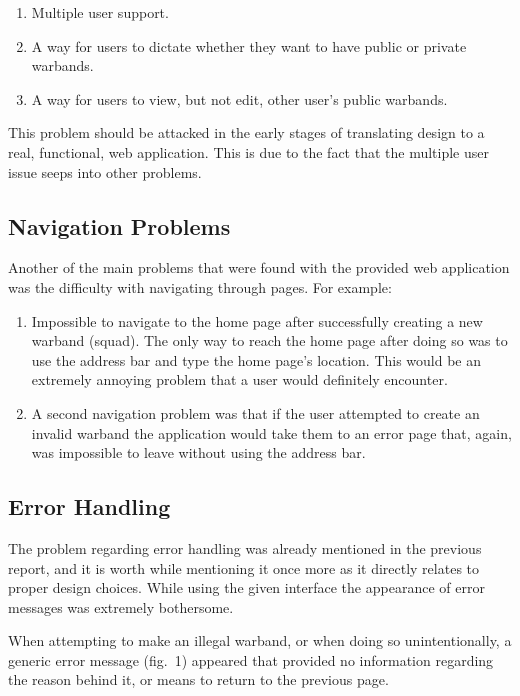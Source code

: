 \documentclass[12pt,a4paper]{article}
\begin{document}
\begin{enumerate}
 \item Multiple user support.
 \item A way for users to dictate whether they want to have public or private warbands.
 \item A way for users to view, but not edit, other user's public warbands. 
\end{enumerate}

This problem should be attacked in the early stages of translating design to a real, functional, web application. This is due to the fact that the multiple user issue seeps into other problems.

\subsection{Navigation Problems}

Another of the main problems that were found with the provided web application was the difficulty with navigating through pages. For example:

\begin{enumerate}
 \item Impossible to navigate to the home page after successfully creating a new warband (squad). The only way to reach the home page after doing so was to use the address bar and type the home page's location. This would be an extremely annoying problem that a user would definitely encounter.
 \item A second navigation problem was that if the user attempted to create an invalid warband the application would take them to an error page that, again, was impossible to leave without using the address bar.
\end{enumerate}

\subsection{Error Handling}

The problem regarding error handling was already mentioned in the previous report, and it is worth while mentioning it once more as it directly relates to proper design choices. While using the given interface the appearance of error messages was extremely bothersome. 

When attempting to make an illegal warband, or when doing so unintentionally, a generic error message (fig.~1) appeared that provided no information regarding the reason behind it, or means to return to the previous page. 
\end{document}

